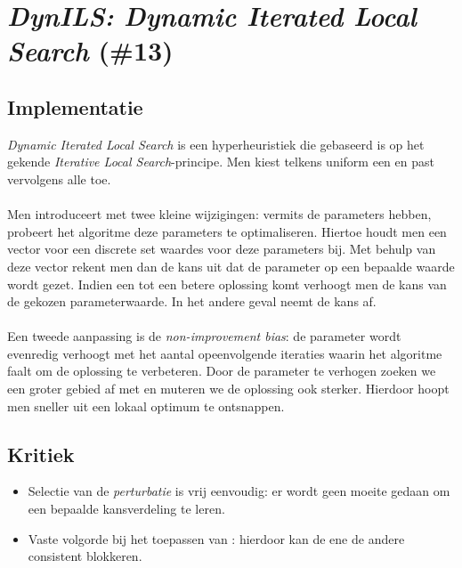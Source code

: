 \section{\emph{DynILS: Dynamic Iterated Local Search} (\#13)}

\subsection{Implementatie}
\emph{Dynamic Iterated Local Search}\cite{chesc-dynils,journals/orsnz/ksosils} is een hyperheuristiek die gebaseerd is op het gekende \emph{Iterative Local Search}\cite{Lourenco02iteratedlocal}-principe. Men kiest telkens uniform een \abpte{} \abllh{} en past vervolgens alle \abls{} \abhn{} toe.

\paragraph{}
Men introduceert met twee kleine wijzigingen: vermits de \abhn{} parameters hebben, probeert het algoritme deze parameters te optimaliseren. Hiertoe houdt men een vector voor een discrete set waardes voor deze parameters bij. Met behulp van deze vector rekent men dan de kans uit dat de parameter op een bepaalde waarde wordt gezet. Indien een \abllh{} tot een betere oplossing komt verhoogt men de kans van de gekozen parameterwaarde. In het andere geval neemt de kans af.

\paragraph{}
Een tweede aanpassing is de \emph{non-improvement bias}: de parameter wordt evenredig verhoogt met het aantal opeenvolgende iteraties waarin het algoritme faalt om de oplossing te verbeteren. Door de parameter te verhogen zoeken we een groter gebied af met \abls{} en muteren we de oplossing ook sterker. Hierdoor hoopt men sneller uit een lokaal optimum te ontsnappen.
\subsection{Kritiek}
\begin{itemize}
 \item Selectie van de \emph{perturbatie} is vrij eenvoudig: er wordt geen moeite gedaan om een bepaalde kansverdeling te leren.
 \item Vaste volgorde bij het toepassen van \abls{}: hierdoor kan de ene \abls{} \abh{} de andere consistent blokkeren.
\end{itemize}